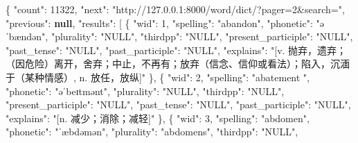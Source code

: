 \documentclass[
]{article}
\newenvironment{Shaded}{}{}
\newcommand{\DataTypeTok}[1]{\textcolor[rgb]{0.56,0.13,0.00}{#1}}
\newcommand{\DecValTok}[1]{\textcolor[rgb]{0.25,0.63,0.44}{#1}}
\newcommand{\FunctionTok}[1]{\textcolor[rgb]{0.02,0.16,0.49}{#1}}
\newcommand{\KeywordTok}[1]{\textcolor[rgb]{0.00,0.44,0.13}{\textbf{#1}}}
\newcommand{\OtherTok}[1]{\textcolor[rgb]{0.00,0.44,0.13}{#1}}
\newcommand{\StringTok}[1]{\textcolor[rgb]{0.25,0.44,0.63}{#1}}
\begin{document}
\begin{Shaded}
\begin{Highlighting}[]
\FunctionTok{\{}
  \DataTypeTok{"count"}\FunctionTok{:} \DecValTok{11322}\FunctionTok{,}
  \DataTypeTok{"next"}\FunctionTok{:} \StringTok{"http://127.0.0.1:8000/word/dict/?pager=2\&search="}\FunctionTok{,}
  \DataTypeTok{"previous"}\FunctionTok{:} \KeywordTok{null}\FunctionTok{,}
  \DataTypeTok{"results"}\FunctionTok{:} \OtherTok{[}
    \FunctionTok{\{}
      \DataTypeTok{"wid"}\FunctionTok{:} \DecValTok{1}\FunctionTok{,}
      \DataTypeTok{"spelling"}\FunctionTok{:} \StringTok{"abandon"}\FunctionTok{,}
      \DataTypeTok{"phonetic"}\FunctionTok{:} \StringTok{"əˈbændən"}\FunctionTok{,}
      \DataTypeTok{"plurality"}\FunctionTok{:} \StringTok{"NULL"}\FunctionTok{,}
      \DataTypeTok{"thirdpp"}\FunctionTok{:} \StringTok{"NULL"}\FunctionTok{,}
      \DataTypeTok{"present\_participle"}\FunctionTok{:} \StringTok{"NULL"}\FunctionTok{,}
      \DataTypeTok{"past\_tense"}\FunctionTok{:} \StringTok{"NULL"}\FunctionTok{,}
      \DataTypeTok{"past\_participle"}\FunctionTok{:} \StringTok{"NULL"}\FunctionTok{,}
      \DataTypeTok{"explains"}\FunctionTok{:} \StringTok{"[\textquotesingle{}v. 抛弃，遗弃；（因危险）离开，舍弃；中止，不再有；放弃（信念、信仰或看法）；陷入，沉湎于（某种情感）\textquotesingle{}, \textquotesingle{}n. 放任，放纵\textquotesingle{}]"}
    \FunctionTok{\}}\OtherTok{,}
    \FunctionTok{\{}
      \DataTypeTok{"wid"}\FunctionTok{:} \DecValTok{2}\FunctionTok{,}
      \DataTypeTok{"spelling"}\FunctionTok{:} \StringTok{"abatement "}\FunctionTok{,}
      \DataTypeTok{"phonetic"}\FunctionTok{:} \StringTok{"əˈbeɪtmənt"}\FunctionTok{,}
      \DataTypeTok{"plurality"}\FunctionTok{:} \StringTok{"NULL"}\FunctionTok{,}
      \DataTypeTok{"thirdpp"}\FunctionTok{:} \StringTok{"NULL"}\FunctionTok{,}
      \DataTypeTok{"present\_participle"}\FunctionTok{:} \StringTok{"NULL"}\FunctionTok{,}
      \DataTypeTok{"past\_tense"}\FunctionTok{:} \StringTok{"NULL"}\FunctionTok{,}
      \DataTypeTok{"past\_participle"}\FunctionTok{:} \StringTok{"NULL"}\FunctionTok{,}
      \DataTypeTok{"explains"}\FunctionTok{:} \StringTok{"[\textquotesingle{}n. 减少；消除；减轻\textquotesingle{}]"}
    \FunctionTok{\}}\OtherTok{,}
    \FunctionTok{\{}
      \DataTypeTok{"wid"}\FunctionTok{:} \DecValTok{3}\FunctionTok{,}
      \DataTypeTok{"spelling"}\FunctionTok{:} \StringTok{"abdomen"}\FunctionTok{,}
      \DataTypeTok{"phonetic"}\FunctionTok{:} \StringTok{"ˈæbdəmən"}\FunctionTok{,}
      \DataTypeTok{"plurality"}\FunctionTok{:} \StringTok{"abdomens"}\FunctionTok{,}
      \DataTypeTok{"thirdpp"}\FunctionTok{:} \StringTok{"NULL"}\FunctionTok{,}

\end{Highlighting}
\end{Shaded}
\end{document}
